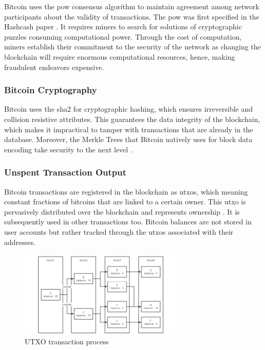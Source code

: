 Bitcoin uses the \gls{pow} consensus algorithm to maintain agreement among network participants about the validity of transactions. The \gls{pow} was first 
specified in the Hashcash paper \cite{9129332}. It requires miners to search for solutions of cryptographic puzzles consuming computational power. Through the cost of computation, miners
establish their commitment to the security of the network as changing the blockchain will require enormous computational resources, hence, making fraudulent endeavors expensive.

\subsubsection{Bitcoin Cryptography}

Bitcoin uses the \gls{sha2} for cryptographic hashing, which ensures irreversible and collision resistive attributes. This guarantees the data integrity of the 
blockchain, which makes it impractical to tamper with transactions that are already in the database. Moreover, the Merkle Trees that Bitcoin natively uses for block data 
encoding take security to the next level \cite{9129332}.

\subsubsection{Unspent Transaction Output} 

Bitcoin transactions are registered in the blockchain as \gls{utxo}s, which meaning constant fractions of bitcoins that are linked to a certain owner. 
This \gls{utxo} is pervasively distributed over the blockchain and represents ownership \cite{bitcoincom}. It is subsequently used in other transactions too. Bitcoin balances are not stored in user 
accounts but rather tracked through the \gls{utxo}s associated with their addresses.

\begin{figure}[h]  
  \centering
  \includegraphics[width=0.7\textwidth]{Images/c2_3.png} 
  \caption{UTXO transaction process}
\end{figure}

